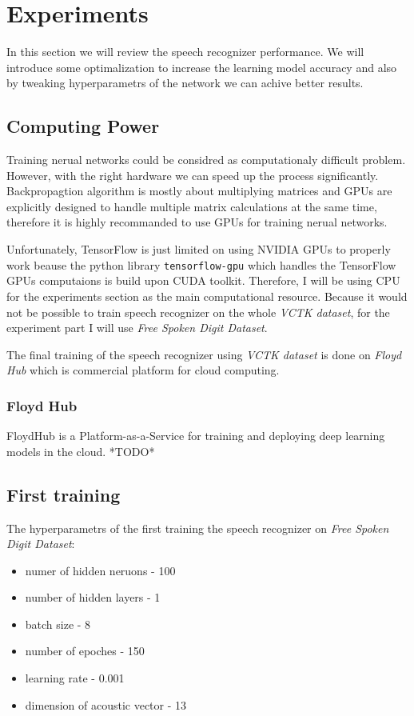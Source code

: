 \chapter{Experiments}

In this section we will review the speech recognizer performance.
We will introduce some optimalization to increase the learning model accuracy and also by tweaking hyperparametrs of the network we can achive better results.

\section{Computing Power}

Training nerual networks could be considred as computationaly difficult problem.
However, with the right hardware we can speed up the process significantly.
Backpropagtion algorithm is mostly about multiplying matrices and GPUs are explicitly designed to handle multiple matrix calculations at the same time, therefore it is highly recommanded to use GPUs for training nerual networks.

Unfortunately, TensorFlow is just limited on using NVIDIA GPUs to properly work beause the python library \texttt{tensorflow-gpu} which handles the TensorFlow GPUs computaions is build upon CUDA toolkit.
Therefore, I will be using CPU for the experiments section as the main computational resource.
Because it would not be possible to train speech recognizer on the whole \textit{VCTK dataset}, for the experiment part I will use \textit{Free Spoken Digit Dataset}.

The final training of the speech recognizer using \textit{VCTK dataset} is done on \textit{Floyd Hub} which is commercial platform for cloud computing.

\subsection{Floyd Hub}

FloydHub is a Platform-as-a-Service for training and deploying deep learning models in the cloud.
*TODO*

\section{First training}

The hyperparametrs of the first training the speech recognizer on \textit{Free Spoken Digit Dataset}:

\begin{itemize}
	\item numer of hidden neruons - 100
	\item number of hidden layers - 1
	\item batch size - 8
	\item number of epoches - 150
  \item learning rate - 0.001
	\item dimension of acoustic vector - 13
\end{itemize}

